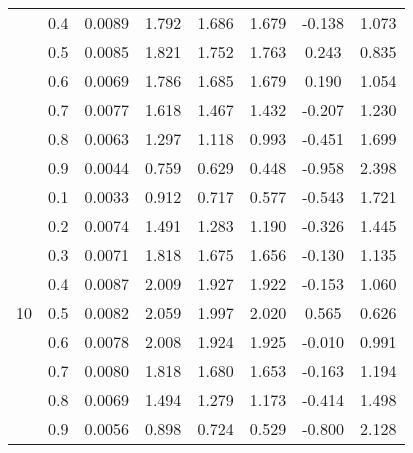 \documentclass[11pt,a4paper]{report}
\begin{document}
\begin{longtable}{ | c | c || c | c | c | c | c | c | }
 & 0.4 & 0.0089 & 1.792 & 1.686 & 1.679 & -0.138 & 1.073 \\
 & 0.5 & 0.0085 & 1.821 & 1.752 & 1.763 & 0.243 & 0.835 \\
 & 0.6 & 0.0069 & 1.786 & 1.685 & 1.679 & 0.190 & 1.054 \\
 & 0.7 & 0.0077 & 1.618 & 1.467 & 1.432 & -0.207 & 1.230 \\
 & 0.8 & 0.0063 & 1.297 & 1.118 & 0.993 & -0.451 & 1.699 \\
 & 0.9 & 0.0044 & 0.759 & 0.629 & 0.448 & -0.958 & 2.398 \\
 \hline
\multirow{9}{*}{10} & 0.1 & 0.0033 & 0.912 & 0.717 & 0.577 & -0.543 & 1.721 \\
 & 0.2 & 0.0074 & 1.491 & 1.283 & 1.190 & -0.326 & 1.445 \\
 & 0.3 & 0.0071 & 1.818 & 1.675 & 1.656 & -0.130 & 1.135 \\
 & 0.4 & 0.0087 & 2.009 & 1.927 & 1.922 & -0.153 & 1.060 \\
 & 0.5 & 0.0082 & 2.059 & 1.997 & 2.020 & 0.565 & 0.626 \\
 & 0.6 & 0.0078 & 2.008 & 1.924 & 1.925 & -0.010 & 0.991 \\
 & 0.7 & 0.0080 & 1.818 & 1.680 & 1.653 & -0.163 & 1.194 \\
 & 0.8 & 0.0069 & 1.494 & 1.279 & 1.173 & -0.414 & 1.498 \\
 & 0.9 & 0.0056 & 0.898 & 0.724 & 0.529 & -0.800 & 2.128 \\
 \hline
\hline
\end{longtable}
\end{document}
